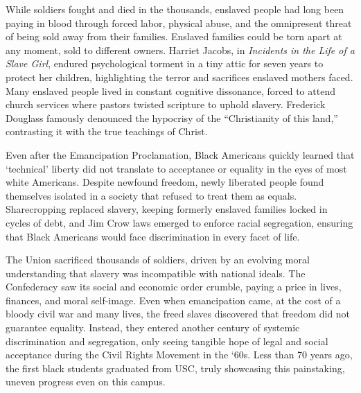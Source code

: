 \documentclass[12pt]{article}
\begin{document}
\medskip

While soldiers fought and died in the thousands, enslaved people had long been paying in blood through forced labor, physical abuse, and the omnipresent threat of being sold away from their families. Enslaved families could be torn apart at any moment, sold to different owners. Harriet Jacobs, in \textit{Incidents in the Life of a Slave Girl}, endured psychological torment in a tiny attic for seven years to protect her children, highlighting the terror and sacrifices enslaved mothers faced.\cite{Jacobs1861,Yellin2004} Many enslaved people lived in constant cognitive dissonance, forced to attend church services where pastors twisted scripture to uphold slavery. Frederick Douglass famously denounced the hypocrisy of the “Christianity of this land,” contrasting it with the true teachings of Christ.\cite{Douglass1845, DouglassChurch}

\medskip

Even after the Emancipation Proclamation, Black Americans quickly learned that ‘technical’ liberty did not translate to acceptance or equality in the eyes of most white Americans.\cite{Franklin2000, Blight2018} Despite newfound freedom, newly liberated people found themselves isolated in a society that refused to treat them as equals. Sharecropping replaced slavery, keeping formerly enslaved families locked in cycles of debt, and Jim Crow laws emerged to enforce racial segregation, ensuring that Black Americans would face discrimination in every facet of life.\cite{Foner1988, Woodward1955}

\medskip

The Union sacrificed thousands of soldiers, driven by an evolving moral understanding that slavery was incompatible with national ideals. The Confederacy saw its social and economic order crumble, paying a price in lives, finances, and moral self-image.\cite{Escott1978, Rable1991} Even when emancipation came, at the cost of a bloody civil war and many lives, the freed slaves discovered that freedom did not guarantee equality. Instead, they entered another century of systemic discrimination and segregation, only seeing tangible hope of legal and social acceptance during the Civil Rights Movement in the ‘60s.\cite{Branch1989, Carson1981} Less than 70 years ago, the first black students graduated from USC, truly showcasing this painstaking, uneven progress even on this campus.\cite{USCTimeline}

\vfill
\end{document}
